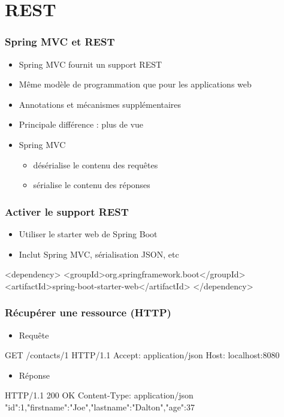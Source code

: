 \section{REST}


\begin{frame}
 \frametitle{Spring MVC et REST}
 \begin{itemize}
  \item Spring MVC fournit un support REST
  \item Même modèle de programmation que pour les applications web
  \item Annotations et mécanismes supplémentaires
  \item Principale différence : plus de vue
  \item Spring MVC
  \begin{itemize}
   \item désérialise le contenu des requêtes
   \item sérialise le contenu des réponses
  \end{itemize}
 \end{itemize}
\end{frame}

\begin{frame}[fragile]
 \frametitle{Activer le support REST}

 \begin{itemize}
  \item Utiliser le starter web de Spring Boot
  \item Inclut Spring MVC, sérialisation JSON, etc
 \end{itemize}

 \begin{xmlcode}
<dependency>
  <groupId>org.springframework.boot</groupId>
  <artifactId>spring-boot-starter-web</artifactId>
</dependency>
 \end{xmlcode}

\end{frame}

\begin{frame}[fragile]
 \frametitle{Récupérer une ressource (HTTP)}

 \begin{itemize}
  \item Requête
 \end{itemize}

 \begin{textcode}
GET /contacts/1 HTTP/1.1
Accept: application/json
Host: localhost:8080
 \end{textcode}

  \begin{itemize}
  \item Réponse
 \end{itemize}

 \begin{textcode}
HTTP/1.1 200 OK
Content-Type: application/json
{"id":1,"firstname":"Joe","lastname":"Dalton","age":37}
 \end{textcode}

\end{frame}

